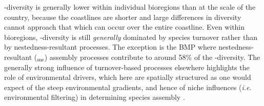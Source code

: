 \documentclass[utf8]{frontiersSCNS} %
\begin{document}
\textbeta-diversity is generally lower within individual bioregions than at the scale of the country, because the coastlines are shorter and large differences in diversity cannot approach that which can occur over the entire coastline. Even within bioregions, \textbeta-diversity is still \emph{generally} dominated by species turnover rather than by nestedness-resultant processes. The exception is the BMP where nestedness-resultant (\textbeta$_{\text{sne}}$) assembly processes contribute to around 58\% of the \textbeta-diversity. The generally strong influence of turnover-based processes elsewhere highlights the role of environmental drivers, which here are spatially structured as one would expect of the steep environmental gradients, and hence of niche influences (\emph{i.e.} environmental filtering) in determining species assembly \citep{Fitzpatrick2013}.
\end{document}
